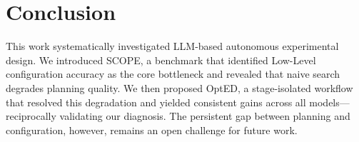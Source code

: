 \documentclass[letterpaper]{article} %
\begin{document}
\section{Conclusion}
This work systematically investigated LLM-based autonomous experimental design. We introduced \textsc{SCOPE}, 
a benchmark that identified Low-Level configuration accuracy as the core bottleneck and revealed that naive search degrades 
planning quality. We then proposed OptED, a stage-isolated workflow that resolved this degradation and yielded consistent 
gains across all models---reciprocally validating our diagnosis. The persistent gap between planning and configuration, 
however, remains an open challenge for future work.



% 

\appendix

\end{document}
